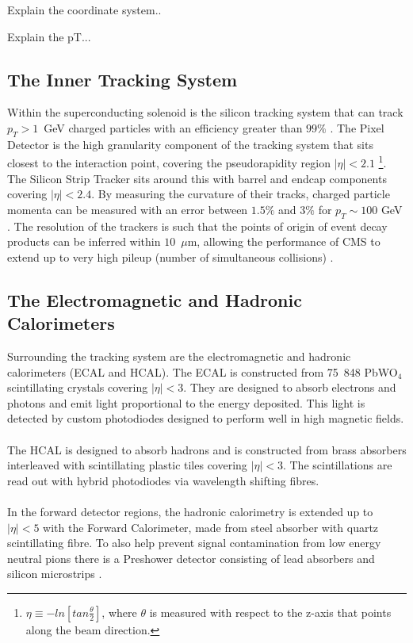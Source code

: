 Explain the coordinate system..

Explain the pT...

\subsection{The Inner Tracking System} Within the superconducting
solenoid is the silicon tracking system that can track
\mbox{$p_T>1$~GeV} charged particles with an efficiency greater than
$99\%$ \cite{Bayatian:2006zz}.
The Pixel Detector is the high granularity component of the tracking
system that sits closest to the interaction point, covering the
pseudorapidity region $|\eta|<2.1$ \footnote{$\eta \equiv
-ln[tan\frac{\theta}{2}]$, where $\theta$ is measured with respect to
the z-axis that points along the beam direction.}. The Silicon Strip
Tracker sits around this with barrel and endcap components covering
$|\eta|<2.4$. By measuring the curvature of their tracks, charged
particle momenta can be measured with an error between $1.5\%$ and
$3\%$ for $p_T\sim 100$ GeV \cite{Adam_Elwood_MSci}. The resolution of
the trackers is such that the points of origin of event decay products
can be inferred within $10$~$\mu$m, allowing the performance of CMS to
extend up to very high pileup (number of simultaneous collisions)
\cite{CMSTrackPerformance}.

\subsection{The Electromagnetic and Hadronic Calorimeters} Surrounding
the tracking system are the electromagnetic and hadronic calorimeters
(ECAL and HCAL). The ECAL is constructed from 75~848 PbWO$_4$
scintillating crystals covering $|\eta|<3$. They are designed to
absorb electrons and photons and emit light proportional to the energy
deposited. This light is detected by custom photodiodes designed to
perform well in high magnetic fields.  \\\\ The HCAL is designed to
absorb hadrons and is constructed from brass absorbers interleaved
with scintillating plastic tiles covering $|\eta|<3$. The
scintillations are read out with hybrid photodiodes via wavelength
shifting fibres.  \\\\ In the forward detector regions, the hadronic
calorimetry is extended up to $|\eta|<5$ with the Forward Calorimeter,
made from steel absorber with quartz scintillating fibre. To also help
prevent signal contamination from low energy neutral pions there is a
Preshower detector consisting of lead absorbers and silicon
microstrips \cite{CMSTechDesign1DetectorPerformance}\cite{Cutajar}.

